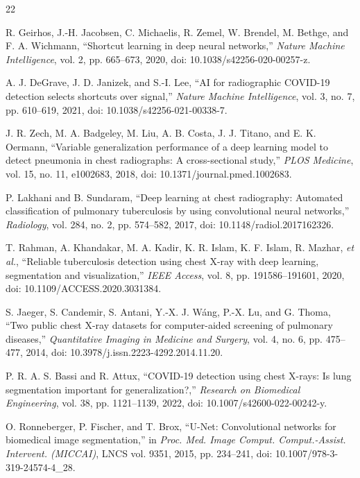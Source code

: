 \documentclass[journal]{IEEEtran}
\begin{document}
\begin{thebibliography}{22}

R. Geirhos, J.-H. Jacobsen, C. Michaelis, R. Zemel, W. Brendel, M. Bethge, and
F. A. Wichmann, ``Shortcut learning in deep neural networks,'' \emph{Nature
Machine Intelligence}, vol. 2, pp. 665--673, 2020, doi:
10.1038/s42256-020-00257-z.

A. J. DeGrave, J. D. Janizek, and S.-I. Lee, ``AI for radiographic COVID-19
detection selects shortcuts over signal,'' \emph{Nature Machine Intelligence},
vol. 3, no. 7, pp. 610--619, 2021, doi: 10.1038/s42256-021-00338-7.

J. R. Zech, M. A. Badgeley, M. Liu, A. B. Costa, J. J. Titano, and E. K.
Oermann, ``Variable generalization performance of a deep learning model to
detect pneumonia in chest radiographs: A cross-sectional study,'' \emph{PLOS
Medicine}, vol. 15, no. 11, e1002683, 2018, doi:
10.1371/journal.pmed.1002683.

P. Lakhani and B. Sundaram, ``Deep learning at chest radiography: Automated
classification of pulmonary tuberculosis by using convolutional neural
networks,'' \emph{Radiology}, vol. 284, no. 2, pp. 574--582, 2017, doi:
10.1148/radiol.2017162326.

T. Rahman, A. Khandakar, M. A. Kadir, K. R. Islam, K. F. Islam, R. Mazhar,
\emph{et al.}, ``Reliable tuberculosis detection using chest X-ray with deep
learning, segmentation and visualization,'' \emph{IEEE Access}, vol. 8, pp.
191586--191601, 2020, doi: 10.1109/ACCESS.2020.3031384.

S. Jaeger, S. Candemir, S. Antani, Y.-X. J. W\'{a}ng, P.-X. Lu, and G. Thoma,
``Two public chest X-ray datasets for computer-aided screening of pulmonary
diseases,'' \emph{Quantitative Imaging in Medicine and Surgery}, vol. 4, no. 6,
pp. 475--477, 2014, doi: 10.3978/j.issn.2223-4292.2014.11.20.

P. R. A. S. Bassi and R. Attux, ``COVID-19 detection using chest X-rays: Is
lung segmentation important for generalization?,'' \emph{Research on Biomedical
Engineering}, vol. 38, pp. 1121--1139, 2022, doi: 10.1007/s42600-022-00242-y.

O. Ronneberger, P. Fischer, and T. Brox, ``U-Net: Convolutional networks for
biomedical image segmentation,'' in \emph{Proc. Med. Image Comput.
Comput.-Assist. Intervent. (MICCAI)}, LNCS vol. 9351, 2015, pp. 234--241, doi:
10.1007/978-3-319-24574-4\_28.


\end{thebibliography}
\end{document}
